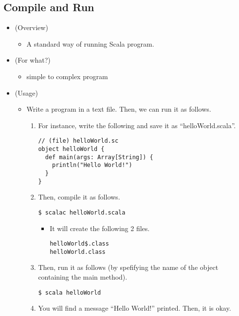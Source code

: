 \documentclass[11pt]{article}
\begin{document}
\subsection*{Compile and Run}
\label{sec:orgheadline9}
\begin{itemize}
\item (Overview)
\begin{itemize}
\item A standard way of running Scala program.
\end{itemize}
\item (For what?)
\begin{itemize}
\item simple to complex program
\end{itemize}
\item (Usage)
\begin{itemize}
\item Write a program in a text file. Then, we can run it as follows.
\begin{enumerate}
\item For instance, write the following and save it as ``helloWorld.scala''.
\begin{verbatim}
// (file) helloWorld.sc
object helloWorld {
  def main(args: Array[String]) {
    println("Hello World!")
  }
}
\end{verbatim}
\item Then, compile it as follows.
\begin{verbatim}
$ scalac helloWorld.scala
\end{verbatim}
\begin{itemize}
\item It will create the following 2 files.
\begin{verbatim}
helloWorld$.class
helloWorld.class
\end{verbatim}
\end{itemize}
\item Then, run it as follows (by spefifying the name of the
object containing the main method).
\begin{verbatim}
$ scala helloWorld
\end{verbatim}
\item You will find a message ``Hello World!'' printed. Then, it is okay.
\end{enumerate}
\end{itemize}
\end{itemize}
\end{document}
